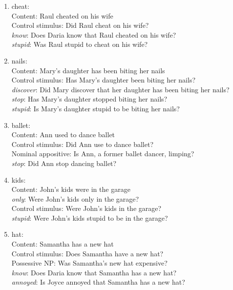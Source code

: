 \documentclass[11pt,fleqn]{article}
\newcommand{\6}{\mbox{$[\hspace*{-.6mm}[$}}
\newcommand{\9}{\mbox{$]\hspace*{-.6mm}]$}}
\begin{document}
\begin{enumerate}
\item cheat:  \\
     Content: Raul cheated on his wife\\
     Control stimulus: Did Raul cheat on his wife?\\
     {\em know}: Does Daria know that Raul cheated on his wife?\\
     {\em stupid}: Was Raul stupid to cheat on his wife?

\item nails:  \\
     Content: Mary's daughter has been biting her nails\\
     Control stimulus: Has Mary's daughter been biting her nails?\\
     {\em discover}: Did Mary discover that her daughter has been biting her nails?\\
     {\em stop}: Has Mary's daughter stopped biting her nails?\\
     {\em stupid}: Is Mary's daughter stupid to be biting her nails?

\item  ballet:  \\
     Content: Ann used to dance ballet\\
     Control stimulus: Did Ann use to dance ballet?\\
     Nominal appositive: Is Ann, a former ballet dancer, limping?\\
     {\em stop}: Did Ann stop dancing ballet?

\item kids:  \\
     Content: John's kids were in the garage\\
     {\em only}: Were John's kids only in the garage?\\
     Control stimulus: Were John's kids in the garage?\\
     {\em stupid}: Were John's kids stupid to be in the garage?

\item hat:  \\
     Content: Samantha has a new hat\\
     Control stimulus: Does Samantha have a new hat?\\
     Possessive NP: Was Samantha's new hat expensive?\\
     {\em know}: Does Daria know that Samantha has a new hat?\\
     {\em annoyed}: Is Joyce annoyed that Samantha has a new hat?


\end{enumerate}
\end{document}
